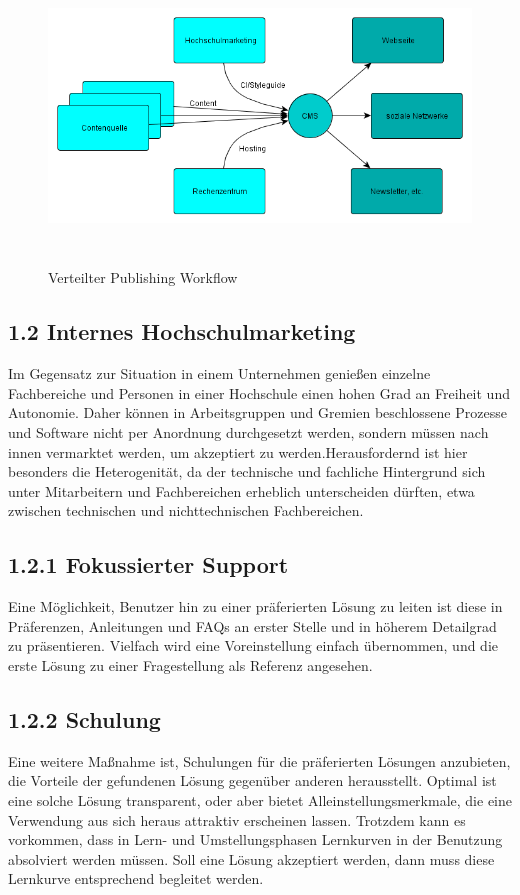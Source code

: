 \documentclass[a4paper]{article}
\begin{document}
\begin{figure}
\centering
\includegraphics[width=15.501cm,height=7.853cm]{VorlaufigeSollSituationeblingsprafkeluebke-img/VorlaufigeSollSituationeblingsprafkeluebke-img001.png}
\caption[Verteilter Publishing Workflow]{Verteilter Publishing Workflow}

\end{figure}
\subsection{1.2 Internes Hochschulmarketing}
{\sffamily
Im Gegensatz zur Situation in einem Unternehmen genießen einzelne Fachbereiche und Personen in einer Hochschule einen
hohen Grad an Freiheit und Autonomie. Daher können in Arbeitsgruppen und Gremien beschlossene Prozesse und Software
nicht per Anordnung durchgesetzt werden, sondern müssen nach innen vermarktet werden, um akzeptiert zu
werden.Herausfordernd ist hier besonders die Heterogenität, da der technische und fachliche Hintergrund sich unter
Mitarbeitern und Fachbereichen erheblich unterscheiden dürften, etwa zwischen technischen und nichttechnischen
Fachbereichen.}

\subsection[1.2.1 Fokussierter Support]{1.2.1 Fokussierter Support}
{\sffamily
Eine Möglichkeit, Benutzer hin zu einer präferierten Lösung zu leiten ist diese in Präferenzen, Anleitungen und FAQs an
erster Stelle und in höherem Detailgrad zu präsentieren. Vielfach wird eine Voreinstellung einfach übernommen, und die
erste Lösung zu einer Fragestellung als Referenz angesehen.}

\subsection{1.2.2 Schulung}
{\sffamily
Eine weitere Maßnahme ist, Schulungen für die präferierten Lösungen anzubieten, die Vorteile der gefundenen Lösung
gegenüber anderen herausstellt. Optimal ist eine solche Lösung transparent, oder aber bietet Alleinstellungsmerkmale,
die eine Verwendung aus sich heraus attraktiv erscheinen lassen. Trotzdem kann es vorkommen, dass in Lern- und
Umstellungsphasen Lernkurven in der Benutzung absolviert werden müssen. Soll eine Lösung akzeptiert werden, dann muss
diese Lernkurve entsprechend begleitet werden.}
\end{document}
